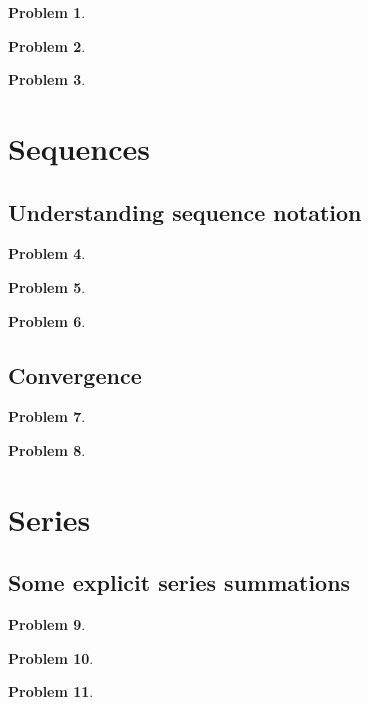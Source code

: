 \documentclass{article}
\newtheorem{problem}{Problem}
\begin{document}
\begin{problem}

\end{problem}
\begin{problem}

\end{problem}


\begin{problem}

\end{problem}

\section{Sequences}
\subsection{Understanding sequence notation}
\begin{problem}

\end{problem}
\begin{problem}

\end{problem}
\begin{problem}

\end{problem}

\subsection{Convergence}
\begin{problem}

\end{problem}
\begin{problem}

\end{problem}
\section{Series}
\subsection{Some explicit series summations}
\begin{problem}

\end{problem}
\begin{problem}

\end{problem}
\begin{problem}

\end{problem}

\end{document}
